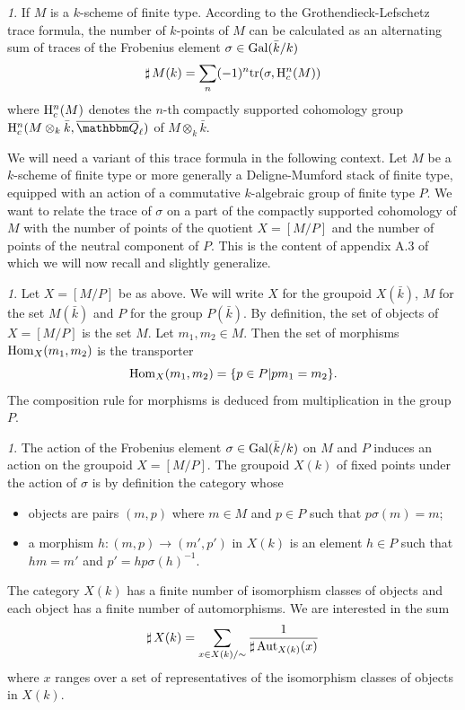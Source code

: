 \documentclass[12pt,english]{smfart}
\numberwithin{equation}{subsection}
\theoremstyle{remark}
\newtheorem{numero}[equation]{}
\newcommand\QQ{{\mathbbm Q}}
\newcommand\rmH{{\rm H}}
\newcommand\Gal{{\rm Gal}}
\newcommand\tr{{\rm tr}}
\newcommand\Hom{{\rm Hom}}
\newcommand\Aut{{\rm Aut}}
\newcommand\Ql{{\overline\QQ_\ell}}
\begin{document}
\begin{numero}
If $M$ is a $k$-scheme of finite type. According to the
Grothendieck-Lefschetz trace formula, the number of $k$-points of $M$ can be
calculated as an alternating sum of traces of the Frobenius
element $\sigma\in\Gal(\bar k/ k)$
$${\sharp\,} M(k)=\sum_n (-1)^n \tr(\sigma,\rmH^n_c(M))$$
where $\rmH^n_c(M)$ denotes the $n$-th compactly supported cohomology group
$\rmH^n_c(M\otimes_k \bar k,\Ql)$ of $M\otimes_k \bar k$.
\end{numero}

We will need a variant of this trace formula in the
following context. Let $M$ be a $k$-scheme of finite type or more
generally a Deligne-Mumford stack of finite type, equipped with an
action of a commutative $k$-algebraic group of finite type $P$. We
want to relate the trace of $\sigma$ on a part of the compactly supported
cohomology of $M$ with the number of points of the quotient $X=[M/ P]$ and the
number of points of the neutral component of $P$. This is the content of
appendix A.3 of \cite{LN} which we will now recall and
slightly generalize.
\begin{numero}
Let $X=[M/ P]$ be as above. We will write
$X$ for the groupoid $X(\bar k)$, $M$ for the set $M(\bar k)$ and $P$
for the group $P(\bar k)$. By definition, the set of objects of $X=[M/
P]$ is the set $M$. Let $m_1, m_2\in M$. Then the set of
morphisms $\Hom_X(m_1,m_2)$ is the transporter
$$\Hom_X(m_1,m_2)=\{p\in P| pm_1=m_2\}.$$
The composition rule for morphisms is deduced from multiplication in
the group $P$.
\end{numero}

\begin{numero}
The action of the Frobenius element $\sigma\in \Gal(\bar k/ k)$ on $M$ and
$P$ induces an action on the groupoid $X=[M/ P]$. The groupoid $X(k)$ of
fixed points under the action of $\sigma$ is by definition the category whose
\begin{itemize}
\item objects are pairs $(m,p)$ where $m\in M$ and $p\in P$ such
  that $p\sigma(m)=m$;
\item a morphism $h:(m,p)\rightarrow (m',p')$ in $X(k)$ is an
  element $h\in P$ such that $hm=m'$ and $p'=hp\sigma(h)^{-1}$.
\end{itemize}
The category $X(k)$ has a finite number of isomorphism classes of objects and
each object has a finite number of automorphisms. We are interested in the
sum
$${\sharp\,} X(k)=\sum_{x\in X(k)/\sim} \frac{1}{{\sharp\,} \Aut_{X(k)}(x)}$$
where $x$ ranges over a set of representatives of the
isomorphism classes of objects in $X(k)$.
\end{numero}
\end{document}
